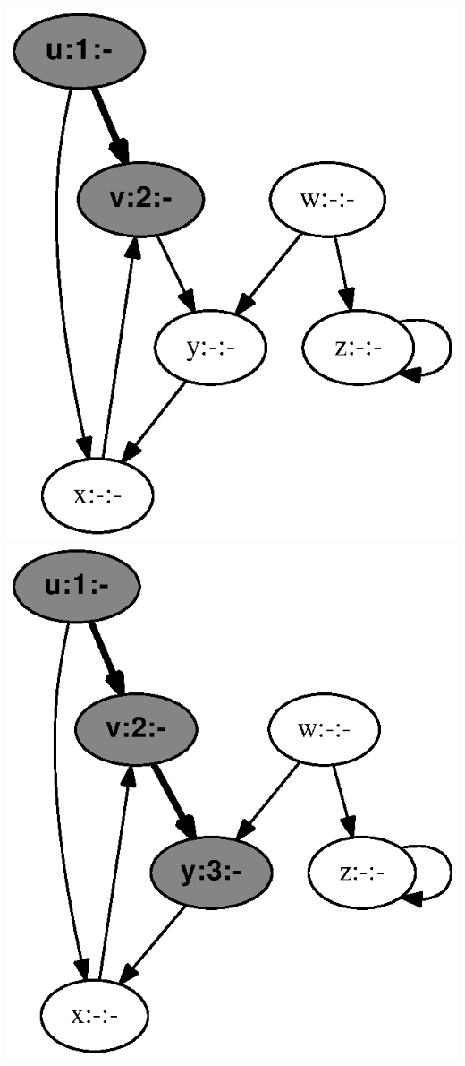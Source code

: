 \documentclass{article}
\begin{document}
\includegraphics[height=.3\textheight]{clrs_example_dfs_02.eps}
\vspace{1em}
\includegraphics[height=.3\textheight]{clrs_example_dfs_03.eps}
\vspace{1em}
\end{document}
